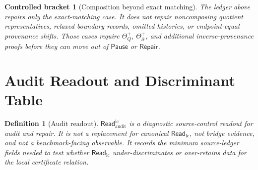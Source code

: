 \documentclass[11pt]{article}
\newcommand{\ReadLC}{\mathsf{Read}_{\mathrm{lc}}}
\newcommand{\ReadAudit}{\mathsf{Read}_{\mathrm{audit}}^{\mathrm{lc}}}
\newcommand{\Pause}{\mathsf{Pause}}
\newcommand{\Repair}{\mathsf{Repair}}
\newtheorem{definition}{Definition}
\newtheorem{bracket}{Controlled bracket}
\begin{document}
\begin{bracket}[Composition beyond exact matching]
The ledger above repairs only the exact-matching case. It does not
repair noncomposing quotient representatives, relaxed boundary
records, omitted histories, or endpoint-equal provenance shifts.
Those cases require \(\Theta_Q^{+}\), \(\Theta_{\partial}^{+}\), and
additional inverse-provenance proofs before they can move out of
\(\Pause\) or \(\Repair\).
\end{bracket}

\section{Audit Readout and Discriminant Table}

\begin{definition}[Audit readout]
\(\ReadAudit\) is a diagnostic source-control readout for audit and
repair. It is not a replacement for canonical \(\ReadLC\), not bridge
evidence, and not a benchmark-facing observable. It records the
minimum source-ledger fields needed to test whether \(\ReadLC\)
under-discriminates or over-retains data for the local certificate
relation.
\end{definition}
\end{document}
